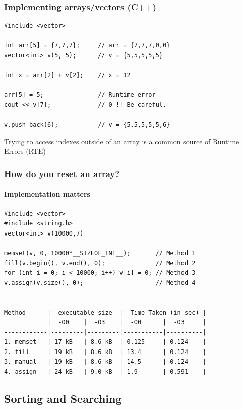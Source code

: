 \documentclass{beamer}
\begin{document}
\begin{frame}[fragile]
  \frametitle{Implementing arrays/vectors (C++)}
  {\small
\begin{verbatim}
#include <vector>

int arr[5] = {7,7,7};     // arr = {7,7,7,0,0}
vector<int> v(5, 5);      // v = {5,5,5,5,5}

int x = arr[2] + v[2];    // x = 12

arr[5] = 5;               // Runtime error
cout << v[7];             // 0 !! Be careful.

v.push_back(6);           // v = {5,5,5,5,5,6}
\end{verbatim}
  }

  \begin{alertblock}{}
    Trying to access indexes outside of an array is a common source of
    Runtime Errors (RTE)
  \end{alertblock}

\end{frame}

\begin{frame}[fragile]
  \frametitle{How do you reset an array?}
  \framesubtitle{Implementation matters}
{\small
\begin{verbatim}
#include <vector>
#include <string.h>
vector<int> v(10000,7)

memset(v, 0, 10000*__SIZEOF_INT__);       // Method 1
fill(v.begin(), v.end(), 0);              // Method 2
for (int i = 0; i < 10000; i++) v[i] = 0; // Method 3
v.assign(v.size(), 0);                    // Method 4


Method      |  executable size  |  Time Taken (in sec) |
            |  -O0    |  -O3    |  -O0      |  -O3     |
------------|---------|---------|-----------|----------|
1. memset   | 17 kB   | 8.6 kB  | 0.125     | 0.124    |
2. fill     | 19 kB   | 8.6 kB  | 13.4      | 0.124    |
3. manual   | 19 kB   | 8.6 kB  | 14.5      | 0.124    |
4. assign   | 24 kB   | 9.0 kB  | 1.9       | 0.591    |
\end{verbatim}
}
\end{frame}

\subsection{Sorting and Searching}
\end{document}
